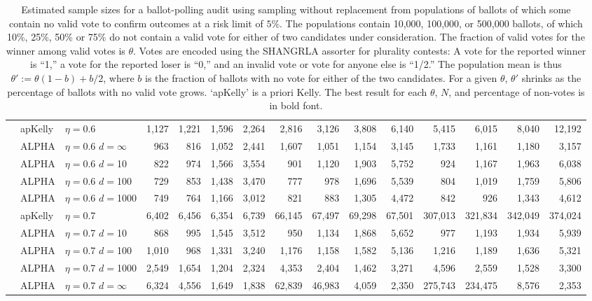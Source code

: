 \documentclass[12pt,runningheads]{llncs}
\begin{document}
{\begin{table}
\begin{tabular}{lll|rrrr|rrrr|rrrr}
\cline{2-15} & apKelly & $\eta=$0.6 & 1,127  & 1,221  & 1,596  & 2,264  & 2,816  & 3,126  & 3,808  & 6,140  & 5,415  & 6,015  & 8,040  & 12,192  \\
 & ALPHA & $\eta=$0.6 $d=\infty$ & 963  & 816  & 1,052  & 2,441  & 1,607  & 1,051  & 1,154  & 3,145  & 1,733  & 1,161  & 1,180  & 3,157  \\
& ALPHA & $\eta=$0.6 $d=$10 & 822  & 974  & 1,566  & 3,554  & 901  & 1,120  & 1,903  & 5,752  & 924  & 1,167  & 1,963  & 6,038  \\
& ALPHA & $\eta=$0.6 $d=$100 & 729  & 853  & 1,438  & 3,470  & 777  & 978  & 1,696  & 5,539  & 804  & 1,019  & 1,759  & 5,806  \\
& ALPHA & $\eta=$0.6 $d=$1000 & 749  & 764  & 1,166  & 3,012  & 821  & 883  & 1,305  & 4,472  & 842  & 926  & 1,343  & 4,612  \\
\cline{2-15} & apKelly & $\eta=$0.7 & 6,402  & 6,456  & 6,354  & 6,739  & 66,145  & 67,497  & 69,298  & 67,501  & 307,013  & 321,834  & 342,049  & 374,024  \\
& ALPHA & $\eta=$0.7 $d=$10 & 868  & 995  & 1,545  & 3,512  & 950  & 1,134  & 1,868  & 5,652  & 977  & 1,193  & 1,934  & 5,939  \\
& ALPHA & $\eta=$0.7 $d=$100 & 1,010  & 968  & 1,331  & 3,240  & 1,176  & 1,158  & 1,582  & 5,136  & 1,216  & 1,189  & 1,636  & 5,321  \\
& ALPHA & $\eta=$0.7 $d=$1000 & 2,549  & 1,654  & 1,204  & 2,324  & 4,353  & 2,404  & 1,462  & 3,271  & 4,596  & 2,559  & 1,528  & 3,300  \\
 & ALPHA & $\eta=$0.7 $d=\infty$ & 6,324  & 4,556  & 1,649  & 1,838  & 62,839  & 46,983  & 4,059  & 2,350  & 275,743  & 234,475  & 8,576  & 2,353 
\end{tabular}
 \caption{\protect \label{tab:without-replacement-blanks-1}
Estimated sample sizes for a ballot-polling audit using sampling without replacement from populations of ballots of which
some contain no valid vote to confirm outcomes at a risk limit of $5\%$.
The populations contain 10,000, 100,000, or 500,000 ballots, of which 10\%, 25\%, 50\% or 75\% do not
contain a valid vote for either of two candidates under consideration.
The fraction of valid votes for the winner among valid votes is $\theta$. 
Votes are encoded using the SHANGRLA assorter for plurality contests:
A vote for the reported winner is ``1,'' a vote for the reported loser is ``0,'' and an invalid vote or vote for anyone else is ``1/2.''
The population mean is thus $\theta' := \theta(1-b) + b/2$, where $b$ is the fraction of ballots with no
vote for either of the two candidates.
For a given $\theta$, $\theta'$ shrinks as the percentage of ballots with no valid vote grows.
`apKelly' is a priori Kelly.
The best result for each $\theta$, $N$, and percentage of non-votes is in bold font.
}
\end{table}

}
\end{document}
